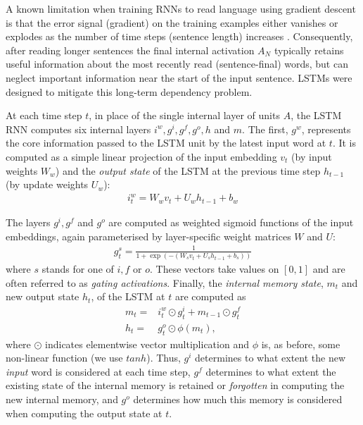 \documentclass[11pt,letterpaper]{article}
\begin{document}
A known limitation when training RNNs to read language using gradient descent is that the error signal (gradient) on the training examples either vanishes or explodes as the number of time steps (sentence length) increases \cite{bengio1994learning}. Consequently, after reading longer sentences the final internal activation \(A_N\) typically retains useful information about the most recently read (sentence-final) words, but can neglect important information near the start of the input sentence. LSTMs  \cite{hochreiter1997long} were designed to mitigate this long-term dependency problem. 

At each time step \(t\), in place of the single internal layer of units \(A\),
the LSTM RNN computes six internal layers \(i^w , g^i, g^f , g^o, h\) and
\(m\). The first, \(g^w\), represents the core information passed to the LSTM
unit by the latest input word at \(t\). It is computed as a simple linear
projection of the input embedding \(v_t\) (by input weights \(W_w\)) and the
\emph{output state} of the LSTM at the previous time step \(h_{t-1}\) (by
update weights \(U_w\)):
\begin{align*}
i_t^w = W_w v_t + U_wh_{t-1} +  b_w
\end{align*}

The layers \(g^i, g^f \) and \(g^o \) are computed as weighted sigmoid
functions of the input embeddings, again parameterised by layer-specific weight
matrices \(W\) and \(U\):
\begin{align*}
g_t^s = \frac{1}{1+\exp(-(W_s v_t + U_sh_{t-1} + b_s  ))}
\end{align*}
where \(s\) stands for one of \(i,f\) or \(o\). These vectors take
values on \([0,1]\) and are often referred to as \emph{gating activations}.
Finally, the \emph{internal memory state}, \(m_t\) and new output state
\(h_t\), of the LSTM at \(t\) are computed as
\begin{align*}
    m_t =& i_t^w \odot g_t^i + m_{t-1} \odot g_t^f \\
    h_t =& g_t^o \odot \phi(m_t), 
\end{align*}
where \(\odot\) indicates elementwise vector multiplication and \(\phi\) is, as
before, some non-linear function (we use \(tanh\)). Thus, \(g^i\) determines to
what extent the new \emph{input} word is considered at each time step, \(g^f\)
determines to what extent the existing state of the internal memory is retained
or \emph{forgotten} in computing the new internal memory, and \(g^o\)
determines how much this memory is considered when computing the output state
at \(t\). 
\end{document}

